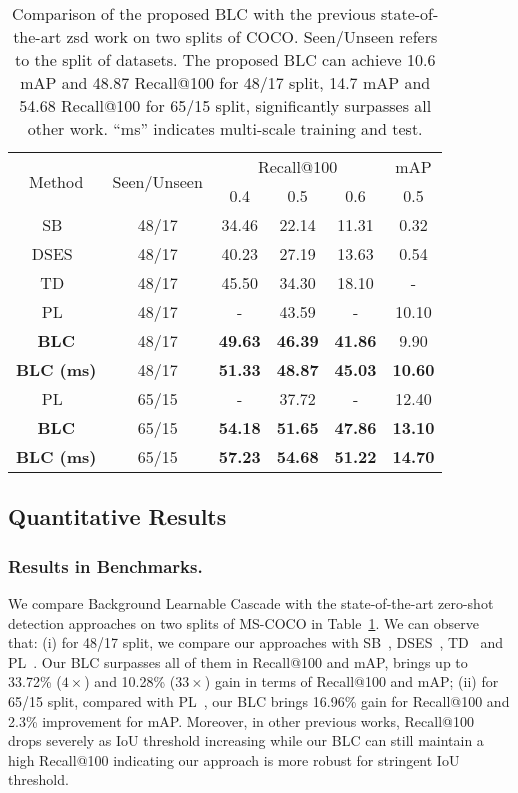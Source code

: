 \documentclass[runningheads]{llncs}
\begin{document}
\begin{table}[tbp]
\begin{center}
\caption{Comparison of the proposed BLC with the previous state-of-the-art zsd work on two splits of COCO. Seen/Unseen refers to the split of datasets. The proposed BLC can achieve 10.6 mAP and 48.87 Recall@100 for 48/17 split, 14.7 mAP and 54.68 Recall@100 for 65/15 split, significantly surpasses all other work. “ms” indicates multi-scale training and test.}
\label{table:benchmark result}
\begin{tabular}{cccccc}
\toprule
\multirow{2}{*}{Method} & \multirow{2}{*}{Seen/Unseen} & \multicolumn{3}{c}{Recall@100} & mAP \\
\cmidrule(lr){3-5} \cmidrule(lr){6-6}
~ & ~ & 0.4 & 0.5 & 0.6 & 0.5 \\
\midrule
SB~\cite{bansal2018zero} & 48/17 & 34.46 & 22.14 & 11.31 & 0.32 \\
DSES~\cite{bansal2018zero} & 48/17 & 40.23 & 27.19 & 13.63 & 0.54 \\
TD~\cite{li2019zero} & 48/17 & 45.50 & 34.30 & 18.10 & - \\
PL~\cite{rahman2020improved} & 48/17 & - & 43.59 & - & 10.10 \\
\hline
\textbf{BLC } & 48/17 &  \textbf{49.63} &  \textbf{46.39} &  \textbf{41.86} & 9.90 \\
\textbf{BLC (ms)} & 48/17 &  \textbf{51.33} & \textbf{48.87} & \textbf{45.03} & \textbf{10.60} \\
\bottomrule
PL~\cite{rahman2020improved} & 65/15 & - & 37.72 & - & 12.40  \\
\hline
\textbf{BLC} & 65/15 & \textbf{54.18} & \textbf{51.65} & \textbf{47.86} & \textbf{13.10} \\
\textbf{BLC (ms)} & 65/15 &  \textbf{57.23} & \textbf{54.68} & \textbf{51.22} & \textbf{14.70} \\
\bottomrule
\end{tabular}
\end{center}
\end{table}
\setlength{\tabcolsep}{1.4pt}
\subsection{Quantitative Results}
\subsubsection{Results in Benchmarks.}
We compare Background Learnable Cascade with the state-of-the-art zero-shot detection approaches on two splits of MS-COCO in Table~\ref{table:benchmark result}. We can observe that: (i) for 48/17 split, we compare our approaches with SB~\cite{bansal2018zero}, DSES~\cite{bansal2018zero}, TD~\cite{li2019zero} and PL~\cite{rahman2020improved}. Our BLC surpasses all of them in Recall@100 and mAP, brings up to 33.72\% ($4\times$) and 10.28\% ($33\times$) gain in terms of Recall@100 and mAP; (ii) for 65/15 split, compared with PL~\cite{rahman2020improved}, our BLC brings 16.96\% gain for Recall@100 and 2.3\% improvement for mAP.
Moreover, in other previous works, Recall@100 drops severely as IoU threshold increasing while our BLC can still maintain a high Recall@100 indicating our approach is more robust for stringent IoU threshold.
\end{document}
